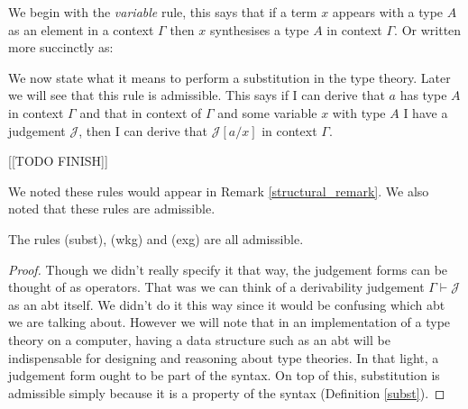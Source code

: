 \begin{defin}
    We begin with the \emph{variable} rule, this says that if a term $x$ appears with a type $A$ as an element in a context $\Gamma$ then $x$ synthesises a type $A$ in context $\Gamma$. Or written more succinctly as:

    \begin{prooftree}
    \end{prooftree}

    We now state what it means to perform a substitution in the type theory. Later we will see that this rule is admissible. This says if I can derive that $a$ has type $A$ in context $\Gamma$ and that in context of $\Gamma$ and some variable $x$ with type $A$ I have a judgement $\mathcal{J}$, then I can derive that $\mathcal{J}[a/x]$ in context $\Gamma$.

    \begin{prooftree}
    \end{prooftree}

    \begin{prooftree}
    \end{prooftree}
    
        [[TODO FINISH]]

\end{defin}

\begin{remark}
    We noted these rules would appear in Remark \ref{structural_remark}. We also noted that these rules are admissible.
\end{remark}

\begin{lemma}
    The rules (subst), (wkg) and (exg) are all admissible.
\end{lemma}

\begin{proof}
    Though we didn't really specify it that way, the judgement forms can be thought of as operators. That was we can think of a derivability judgement $\Gamma \vdash \mathcal{J}$ as an abt itself. We didn't do it this way since it would be confusing which abt we are talking about. However we will note that in an implementation of a type theory on a computer, having a data structure such as an abt will be indispensable for designing and reasoning about type theories. In that light, a judgement form ought to be part of the syntax. On top of this, substitution is admissible simply because it is a property of the syntax (Definition \ref{subst}).
\end{proof}


